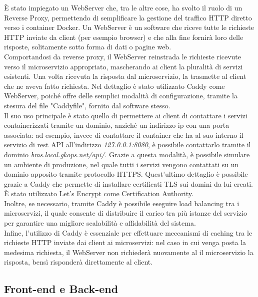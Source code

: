 È stato impiegato un WebServer che, tra le altre cose, ha svolto il ruolo di un Reverse Proxy, permettendo di semplificare la gestione del traffico HTTP diretto verso i container Docker. Un WebServer è un software che riceve tutte le richieste HTTP inviate da client (per esempio browser) e che alla fine fornirà loro delle risposte, solitamente sotto forma di dati o pagine web.
\\Comportandosi da reverse proxy, il WebServer reinstrada le richieste ricevute verso il microservizio appropriato, mascherando ai client la pluralità di servizi esistenti. Una volta ricevuta la risposta dal microservizio, la trasmette al client che ne aveva fatto richiesta. Nel dettaglio è stato utilizzato Caddy come WebServer, poiché offre delle semplici modalità di configurazione, tramite la stesura del file "Caddyfile", fornito dal software stesso. 
\\Il suo uso principale è stato quello di permettere ai client di contattare i servizi containerizzati tramite un dominio, anziché un indirizzo ip con una porta associata: ad esempio, invece di contattare il container che ha al suo interno il servizio di rest API all'indirizzo \textit{127.0.0.1:8080}, è possibile contattarlo tramite il dominio \textit{bms.local.gkops.net/api/}. Grazie a questa modalità, è possibile simulare un ambiente di produzione, nel quale tutti i servizi vengono contattati su un dominio apposito tramite protocollo HTTPS. Quest'ultimo dettaglio è possibile grazie a Caddy che permette di installare certificati TLS sui domini da lui creati. È stato utilizzato Let's Encrypt come Certification Authority.
\\Inoltre, se necessario, tramite Caddy è possibile eseguire load balancing tra i microservizi, il quale consente di distribuire il carico tra più istanze del servizio per garantire una migliore scalabilità e affidabilità del sistema.
\\Infine, l'utilizzo di Caddy è essenziale per effettuare meccanismi di caching tra le richieste HTTP inviate dai client ai microservizi: nel caso in cui venga posta la medesima richiesta, il WebServer non richiederà nuovamente al il microservizio la risposta, bensì risponderà direttamente al client.

\subsection{Front-end e Back-end}

